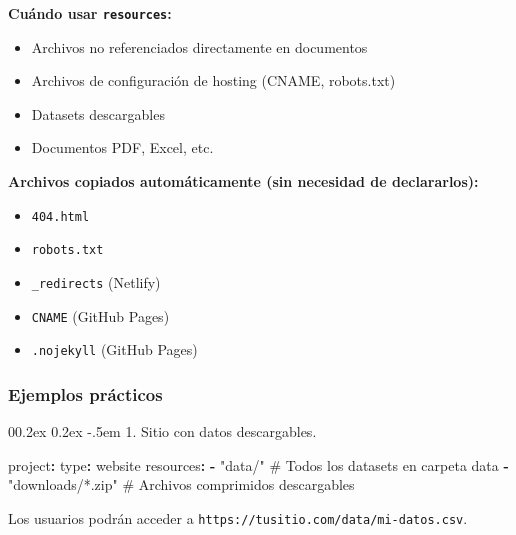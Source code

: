 \documentclass[
  doc,
  floatsintext,
  longtable,
  a4paper,
  nolmodern,
  notxfonts,
  notimes,
  12pt,
  colorlinks=true,linkcolor=blue,citecolor=blue,urlcolor=blue]{apa7}
\makeatletter
\renewcommand{\paragraph}{\@startsection{paragraph}{4}{\parindent}%
	{0\baselineskip \@plus 0.2ex \@minus 0.2ex}%
	{-.5em}%
	{\normalfont\normalsize\bfseries\typesectitle}}
\newenvironment{Shaded}{\begin{snugshade}}{\end{snugshade}}
\newcommand{\AttributeTok}[1]{\textcolor[rgb]{0.40,0.45,0.13}{#1}}
\newcommand{\CommentTok}[1]{\textcolor[rgb]{0.37,0.37,0.37}{#1}}
\newcommand{\FunctionTok}[1]{\textcolor[rgb]{0.28,0.35,0.67}{#1}}
\newcommand{\KeywordTok}[1]{\textcolor[rgb]{0.00,0.23,0.31}{\textbf{#1}}}
\newcommand{\StringTok}[1]{\textcolor[rgb]{0.13,0.47,0.30}{#1}}
\providecommand{\tightlist}{%
  \setlength{\itemsep}{0pt}\setlength{\parskip}{0pt}}
\makeatother
\begin{document}
\textbf{Cuándo usar \texttt{resources}:}

\begin{itemize}
\tightlist
\item
  Archivos no referenciados directamente en documentos
\item
  Archivos de configuración de hosting (CNAME, robots.txt)
\item
  Datasets descargables
\item
  Documentos PDF, Excel, etc.
\end{itemize}

\textbf{Archivos copiados automáticamente (sin necesidad de
declararlos):}

\begin{itemize}
\tightlist
\item
  \texttt{404.html}
\item
  \texttt{robots.txt}
\item
  \texttt{\_redirects} (Netlify)
\item
  \texttt{CNAME} (GitHub Pages)
\item
  \texttt{.nojekyll} (GitHub Pages)
\end{itemize}

\subsubsection{Ejemplos prácticos}\label{ejemplos-pruxe1cticos}

\paragraph{1. Sitio con datos
descargables.}\label{sitio-con-datos-descargables}

\begin{Shaded}
\begin{Highlighting}[]
\FunctionTok{project}\KeywordTok{:}
\AttributeTok{  }\FunctionTok{type}\KeywordTok{:}\AttributeTok{ website}
\AttributeTok{  }\FunctionTok{resources}\KeywordTok{:}
\AttributeTok{    }\KeywordTok{{-}}\AttributeTok{ }\StringTok{"data/"}\CommentTok{                  \# Todos los datasets en carpeta data}
\AttributeTok{    }\KeywordTok{{-}}\AttributeTok{ }\StringTok{"downloads/*.zip"}\CommentTok{        \# Archivos comprimidos descargables}
\end{Highlighting}
\end{Shaded}

Los usuarios podrán acceder a
\texttt{https://tusitio.com/data/mi-datos.csv}.
\end{document}
